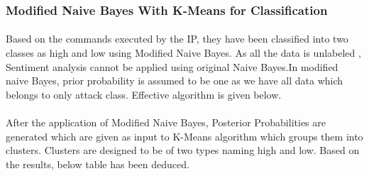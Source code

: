 \documentclass{report}
\begin{document}
\subsubsection{Modified Naive Bayes With K-Means for Classification}
\paragraph{}
Based on the commands executed by the IP, they have been classified into two classes as high and low using Modified Naive Bayes. As all the data is unlabeled , Sentiment analysis cannot be applied using original Naive Bayes.In modified naive Bayes, prior probability is assumed to be one as we have all data which belongs to only attack class. Effective algorithm is given below.



\paragraph{}
After the application of Modified Naive Bayes, Posterior Probabilities are generated which are given as input to K-Means algorithm which groups them into clusters. Clusters are designed to be of two types naming high and low.
Based on the results, below table has been deduced.




\end{document}
